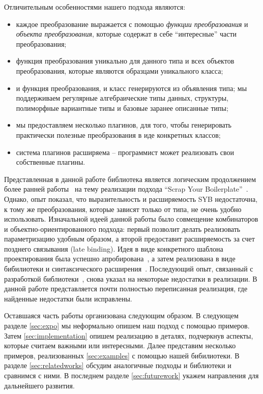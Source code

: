 Отличительным особенностями нашего подхода являются:

\begin{itemize}
\item каждое преобразование выражается с помощью \emph{функции преобразования} и \emph{объекта преобразования}, которые содержат в себе ``интересные'' части преобразования;
\item функция преобразования уникально для данного типа и всех объектов преобразования, которые являются образцами уникального класса;
\item и функция преобразования, и класс генерируются из объявления типа; мы поддерживаем регулярные алгебраические типы данных, структуры, полиморфные вариантные типы и базовые заранее описанные типы;
\item мы предоставляем несколько плагинов, для того, чтобы генерировать практически полезные преобразования в иде конкретных классов;
\item система плагинов расширяема -- программист может реализовать свои собственные плагины.
\end{itemize}

Представленная в данной работе библиотека является логическим продолжением более ранней работы~\cite{SYBOCaml} на тему реализации подхода ``Scrap Your Boilerplate''~\cite{SYB,SYB1,SYB2}. Однако, опыт показал, что выразительность и расширяемость SYB недостаточна, к тому же преобразования, которые зависят только от типа, не очень удобно использовать. Изначальной идеей данной работы было совмещение комбинаторов и объектно-ориентированного подхода: первый позволит делать реализовать параметризацию удобным образом, а второй предоставит расширяемость за счет позднего связывания (late binding). Идея в виде конкретного шаблона проектирования была успешно апробирована~\cite{SCICO}, а затем реализована в виде бибилиотеки и синтаксического расширения~\cite{TransformationObjects}. Последующий опыт, связанный с разработкой библиотеки~\cite{OCanren}, снова указал на некоторые недостатки в реализации. В данной работе представляется почти полностью переписанная реализация, где найденные недостатки были исправлены.

Оставшаяся часть работы организована следующим образом. В следующем разделе \ref{sec:expo} мы неформально опишем наш подход с помощью примеров. Затем \ref{sec:implementation} опишем реализацию в деталях, подчеркнув аспекты, которые считаем важными или интересными. Далее представим несколько примеров, реализованных \ref{sec:examples} с помощью нашей бибилиотеки. В разделе \ref{sec:relatedworks} обсудим аналогичные подходы и библиотеки и сравнимся с ними. В последнем разделе \ref{sec:futurework} укажем направления для дальнейшего развития.



